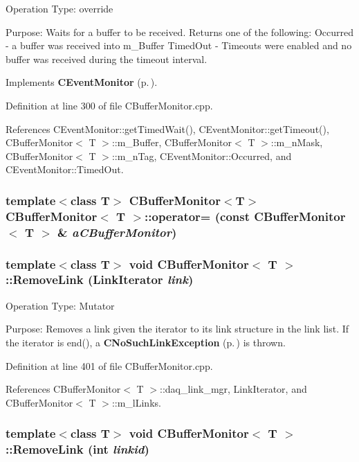 Operation Type: override

Purpose: Waits for a buffer to be received. Returns one of the following:  Occurred - a buffer was received into m\_\-Buffer Timed\-Out - Timeouts were enabled and no buffer was received during the timeout interval. 

Implements {\bf CEvent\-Monitor} {\rm (p.\,\pageref{classCEventMonitor_a7})}.

Definition at line 300 of file CBuffer\-Monitor.cpp.

References CEvent\-Monitor::get\-Timed\-Wait(), CEvent\-Monitor::get\-Timeout(), CBuffer\-Monitor$<$ T $>$::m\_\-Buffer, CBuffer\-Monitor$<$ T $>$::m\_\-n\-Mask, CBuffer\-Monitor$<$ T $>$::m\_\-n\-Tag, CEvent\-Monitor::Occurred, and CEvent\-Monitor::Timed\-Out.
\subsubsection{\setlength{\rightskip}{0pt plus 5cm}template$<$class T$>$ CBuffer\-Monitor$<$T$>$ CBuffer\-Monitor$<$ T $>$::operator= (const CBuffer\-Monitor$<$ T $>$ \& {\em a\-CBuffer\-Monitor})\hspace{0.3cm}{\tt  [private]}}\label{classCBufferMonitor_c1}


\subsubsection{\setlength{\rightskip}{0pt plus 5cm}template$<$class T$>$ void CBuffer\-Monitor$<$ T $>$::Remove\-Link ({\bf Link\-Iterator} {\em link})}\label{classCBufferMonitor_a10}


Operation Type: Mutator

Purpose: Removes a link given the iterator to its link structure in the link list. If the iterator is end(), a {\bf CNo\-Such\-Link\-Exception} {\rm (p.\,\pageref{classCNoSuchLinkException})} is thrown. 

Definition at line 401 of file CBuffer\-Monitor.cpp.

References CBuffer\-Monitor$<$ T $>$::daq\_\-link\_\-mgr, Link\-Iterator, and CBuffer\-Monitor$<$ T $>$::m\_\-l\-Links.
\subsubsection{\setlength{\rightskip}{0pt plus 5cm}template$<$class T$>$ void CBuffer\-Monitor$<$ T $>$::Remove\-Link (int {\em linkid})}\label{classCBufferMonitor_a9}


